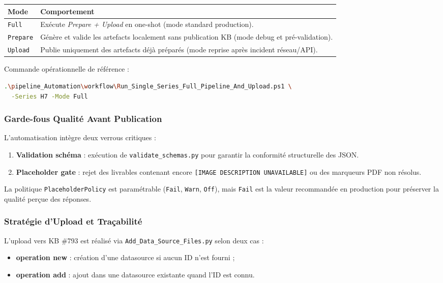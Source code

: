 \begin{longtable}{p{2.8cm}p{9.4cm}}
\toprule
\textbf{Mode} & \textbf{Comportement} \\
\midrule
\texttt{Full} & Exécute \textit{Prepare + Upload} en one-shot (mode standard production). \\
\texttt{Prepare} & Génère et valide les artefacts localement sans publication KB (mode debug et pré-validation). \\
\texttt{Upload} & Publie uniquement des artefacts déjà préparés (mode reprise après incident réseau/API). \\
\bottomrule
\end{longtable}

Commande opérationnelle de référence :
\begin{lstlisting}[language=bash]
.\pipeline_Automation\workflow\Run_Single_Series_Full_Pipeline_And_Upload.ps1 \
  -Series H7 -Mode Full
\end{lstlisting}

\subsubsection{Garde-fous Qualité Avant Publication}

L'automatisation intègre deux verrous critiques :
\begin{enumerate}
  \item \textbf{Validation schéma} : exécution de \texttt{validate\_schemas.py} pour garantir la conformité structurelle des JSON.
  \item \textbf{Placeholder gate} : rejet des livrables contenant encore \texttt{[IMAGE DESCRIPTION UNAVAILABLE]} ou des marqueurs PDF non résolus.
\end{enumerate}

La politique \texttt{PlaceholderPolicy} est paramétrable (\texttt{Fail}, \texttt{Warn}, \texttt{Off}), mais \texttt{Fail} est la valeur recommandée en production pour préserver la qualité perçue des réponses.

\subsubsection{Stratégie d'Upload et Traçabilité}

L'upload vers KB \#793 est réalisé via \texttt{Add\_Data\_Source\_Files.py} selon deux cas :
\begin{itemize}
  \item \textbf{operation new} : création d'une datasource si aucun ID n'est fourni ;
  \item \textbf{operation add} : ajout dans une datasource existante quand l'ID est connu.
\end{itemize}

